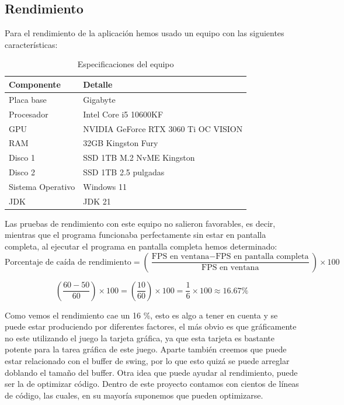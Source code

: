 \documentclass[a4paper]{article}
\begin{document}
\subsection{Rendimiento}
Para el rendimiento de la aplicación hemos usado un equipo con las siguientes características:
\begin{table}[htbp]
    \centering
    \caption{Especificaciones del equipo}
    \begin{tabular}{|l|l|}
        \hline
        \textbf{Componente} & \textbf{Detalle}                     \\
        \hline
        Placa base          & Gigabyte                             \\
        Procesador          & Intel Core i5 10600KF                \\
        GPU                 & NVIDIA GeForce RTX 3060 Ti OC VISION \\
        RAM                 & 32GB Kingston Fury                   \\
        Disco 1             & SSD 1TB M.2  NvME Kingston           \\
        Disco 2             & SSD 1TB 2.5 pulgadas                 \\
        Sistema Operativo   & Windows 11                           \\
        JDK                 & JDK 21                               \\
        \hline
    \end{tabular}
    \label{tab:equipo3}
\end{table}
Las pruebas de rendimiento con este equipo no salieron favorables, es decir, mientras que el programa funcionaba perfectamente sin estar en pantalla completa, al ejecutar el programa en pantalla completa hemos determinado:\\
\begin{equation}
    \text{Porcentaje de caída de rendimiento} = \left( \frac{\text{FPS en ventana} - \text{FPS en pantalla completa}}{\text{FPS en ventana}} \right) \times 100
\end{equation}

\begin{equation}
    \left(\frac{60 - 50}{60}\right)\times 100 = \left( \frac{10}{60} \right) \times 100 = \frac{1}{6} \times 100 \approx 16.67 \%
\end{equation}

Como vemos el rendimiento cae un 16 \%, esto es algo a tener en cuenta y se puede estar produciendo por diferentes factores, el más obvio es que gráficamente no este utilizando el juego la tarjeta gráfica, ya que esta tarjeta es bastante potente para la tarea gráfica de este juego.
Aparte también creemos que puede estar relacionado con el buffer de swing, por lo que esto quizá se puede arreglar doblando el tamaño del buffer. Otra idea que puede ayudar al rendimiento, puede ser la de optimizar código. Dentro
de este proyecto contamos con cientos de líneas de código, las cuales, en su mayoría suponemos que pueden optimizarse.
\end{document}
